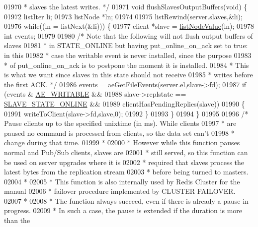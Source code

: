 \begin{DoxyCode}
{{{{{{{{{{{{{{{{{{{{01970 \textcolor{comment}{ * slaves the latest writes. */}
01971 \textcolor{keywordtype}{void} flushSlavesOutputBuffers(\textcolor{keywordtype}{void}) \{
01972     listIter li;
01973     listNode *ln;
01974 
01975     listRewind(server.slaves,&li);
01976     \textcolor{keywordflow}{while}((ln = listNext(&li))) \{
01977         client *slave = \hyperlink{adlist_8h_af84cae230e7180ebcda1e2736fce9f65}{listNodeValue}(ln);
01978         \textcolor{keywordtype}{int} events;
01979 
01980         \textcolor{comment}{/* Note that the following will not flush output buffers of slaves}
01981 \textcolor{comment}{         * in STATE\_ONLINE but having put\_online\_on\_ack set to true: in this}
01982 \textcolor{comment}{         * case the writable event is never installed, since the purpose}
01983 \textcolor{comment}{         * of put\_online\_on\_ack is to postpone the moment it is installed.}
01984 \textcolor{comment}{         * This is what we want since slaves in this state should not receive}
01985 \textcolor{comment}{         * writes before the first ACK. */}
01986         events = aeGetFileEvents(server.el,slave->fd);
01987         \textcolor{keywordflow}{if} (events & \hyperlink{ae_8h_ab6bfb0366ccb6277112d132c2a2bf500}{AE\_WRITABLE} &&
01988             slave->replstate == \hyperlink{server_8h_ad895fdf16e5ed5275d19ddf8578b900f}{SLAVE\_STATE\_ONLINE} &&
01989             clientHasPendingReplies(slave))
01990         \{
01991             writeToClient(slave->fd,slave,0);
01992         \}
01993     \}
01994 \}
01995 
01996 \textcolor{comment}{/* Pause clients up to the specified unixtime (in ms). While clients}
01997 \textcolor{comment}{ * are paused no command is processed from clients, so the data set can't}
01998 \textcolor{comment}{ * change during that time.}
01999 \textcolor{comment}{ *}
02000 \textcolor{comment}{ * However while this function pauses normal and Pub/Sub clients, slaves are}
02001 \textcolor{comment}{ * still served, so this function can be used on server upgrades where it is}
02002 \textcolor{comment}{ * required that slaves process the latest bytes from the replication stream}
02003 \textcolor{comment}{ * before being turned to masters.}
02004 \textcolor{comment}{ *}
02005 \textcolor{comment}{ * This function is also internally used by Redis Cluster for the manual}
02006 \textcolor{comment}{ * failover procedure implemented by CLUSTER FAILOVER.}
02007 \textcolor{comment}{ *}
02008 \textcolor{comment}{ * The function always succeed, even if there is already a pause in progress.}
02009 \textcolor{comment}{ * In such a case, the pause is extended if the duration is more than the}
}}}}}}}}}}}}}}}}}}}}
\end{DoxyCode}
